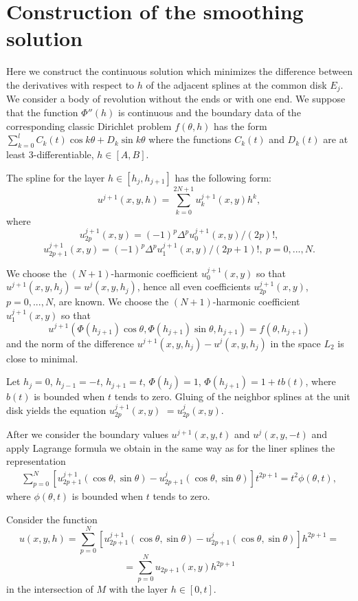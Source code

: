 \documentclass{amsart}
\begin{document}
\section{Construction of the smoothing solution}

Here we construct the continuous solution which minimizes the
difference between the derivatives with respect to $h$ of the
adjacent splines at the common disk $E_j$. We consider a body of
revolution without the ends or with one end. We suppose that the
function $\Phi''(h)$ is continuous and the boundary data of the
corresponding classic Dirichlet problem $f(\theta,h)$ has the form
$\sum\limits_{k=0}^l C_k(t)\cos k\theta +D_k\sin k\theta$ where the
functions $C_k(t)$ and $D_k(t)$ are at least $3$-differentiable,
$h\in[A,B]$.

The spline for the layer $h\in[h_j,h_{j+1}]$ has the following form:
$$
u^{j+1}(x,y,h)=\sum\limits_{k=0}^{2N+1} u_{k}^{j+1}(x,y) h^k,
$$
where
$$
u_{2p}^{j+1}(x,y)=(-1)^p \Delta^p u_0^{j+1}(x,y)/(2p)!,
$$
$$
u_{2p+1}^{j+1}(x,y)=(-1)^p \Delta^p u_1^{j+1}(x,y)/(2p+1)!,\
p=0,...,N.
$$

We choose the $(N+1)$-harmonic coefficient $u_0^{j+1}(x,y)$ so that
$u^{j+1}(x,y,h_j)=u^j(x,y,h_j)$, hence all even coefficients
$u_{2p}^{j+1}(x,y)$, $p=0,...,N$, are known. We choose the
$(N+1)$-harmonic coefficient $u_1^{j+1}(x,y)$ so that
$$
u^{j+1}(\Phi(h_{j+1})\cos\theta,\Phi(h_{j+1})\sin\theta,h_{j+1})=f(\theta,h_{j+1})
$$
and the norm of the difference $u^{j+1}(x,y,h_j)-u^{j}(x,y,h_j)$ in
the space $L_2$ is close to minimal.

Let $h_j=0$, $h_{j-1}=-t$, $h_{j+1}=t$, $\Phi(h_j)=1$,
$\Phi(h_{j+1})=1+ t b(t)$, where $b(t)$ is bounded when $t$ tends to
zero. Gluing of the neighbor splines at the unit disk yields the
equation $u_{2p}^{j+1}(x,y)$ $= u_{2p}^{j}(x,y)$.


After we consider the boundary values  $u^{j+1}(x,y,t)$ and
$u^{j}(x,y,-t)$ and apply Lagrange formula we obtain in the same way
as for the liner splines the representation
\begin{eqnarray}
\sum\limits_{p=0}^N [u_{2p+1}^{j+1}(\cos\theta,\sin\theta) -
u_{2p+1}^{j}(\cos\theta,\sin\theta)]t^{2p+1} = t^2
\phi(\theta,t),\label{eq:3}
\end{eqnarray}
where $\phi(\theta,t)$ is bounded when $t$ tends to zero.

Consider the function
$$
u(x,y,h)=\sum\limits_{p=0}^N [u_{2p+1}^{j+1}(\cos\theta,\sin\theta)
- u_{2p+1}^{j}(\cos\theta,\sin\theta)]h^{2p+1}=
$$
$$
=\sum\limits_{p=0}^N u_{2p+1}(x,y) h^{2p+1}
$$
in the intersection of $M$ with the layer $h\in[0,t]$.
\end{document}
